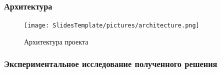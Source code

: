 \documentclass[aspectratio=169]{beamer}
\begin{document}


\begin{frame}
\transwipe[direction=90]
 \frametitle{Архитектура}
 \begin{figure}[H]
\centering
\texttt{[image: SlidesTemplate/pictures/architecture.png]}
\caption{Архитектура проекта}
\end{figure}
\end{frame}

\begin{frame}
  \transwipe[direction=90]
  \frametitle{Экспериментальное исследование полученного решения}


\end{frame}
\end{document}

